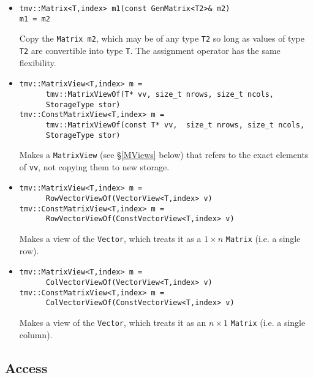 \documentclass[twoside,letterpaper,11pt]{article}
\renewcommand{\tt}[1]{{\texttt {#1}}}
\begin{document}
\begin{itemize}
\item
\begin{verbatim}
tmv::Matrix<T,index> m1(const GenMatrix<T2>& m2)
m1 = m2
\end{verbatim}
Copy the \tt{Matrix m2}, which may be of any type \tt{T2} so long
as values of type \tt{T2} are convertible into type \tt{T}.
The assignment operator has the same flexibility.

\item
\begin{verbatim}
tmv::MatrixView<T,index> m = 
      tmv::MatrixViewOf(T* vv, size_t nrows, size_t ncols, 
      StorageType stor)
tmv::ConstMatrixView<T,index> m = 
      tmv::MatrixViewOf(const T* vv,  size_t nrows, size_t ncols, 
      StorageType stor)
\end{verbatim}
Makes a \tt{MatrixView} (see \S\ref{MViews} below) that refers to the exact
elements of \tt{vv}, not copying them to new storage.

\item
\begin{verbatim}
tmv::MatrixView<T,index> m = 
      RowVectorViewOf(VectorView<T,index> v)
tmv::ConstMatrixView<T,index> m = 
      RowVectorViewOf(ConstVectorView<T,index> v)
\end{verbatim}
Makes a view of the \tt{Vector}, which treats it as a $1\times n$ \tt{Matrix}
(i.e. a single row).  

\item
\begin{verbatim}
tmv::MatrixView<T,index> m = 
      ColVectorViewOf(VectorView<T,index> v)
tmv::ConstMatrixView<T,index> m = 
      ColVectorViewOf(ConstVectorView<T,index> v)
\end{verbatim}
Makes a view of the \tt{Vector}, which treats it as an $n \times 1$ \tt{Matrix}
(i.e. a single column).  

\end{itemize}

\subsection{Access}
\end{document}
